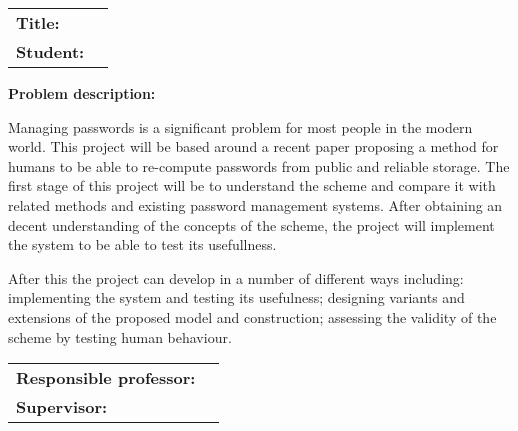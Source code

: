 \begin{titlingpage}

\noindent
\begin{tabular}{@{}p{4cm}l}
\textbf{Title:} 	& \thetitle \\
\textbf{Student:}	& \theauthor \\
\end{tabular}

\vspace{4ex}
\noindent\textbf{Problem description:}

Managing passwords is a significant problem for most people in the modern world. This project will be based
around a recent paper proposing a method for humans to be able to re-compute passwords from public and
reliable storage. The first stage of this project will be to understand the scheme and compare it with related
methods and existing password management systems. After obtaining an decent understanding of the concepts of the scheme, the project will implement the system to be able to test its usefullness.


After this the project can develop in a number of
different ways including: implementing the system and testing its usefulness; designing variants and extensions
of the proposed model and construction; assessing the validity of the scheme by testing human behaviour.


\noindent
\begin{tabular}{@{}p{4cm}l}
\textbf{Responsible professor:} 	& \theprofessor \\
\textbf{Supervisor:}			& \thesupervisor \\
\end{tabular}

\end{titlingpage}
